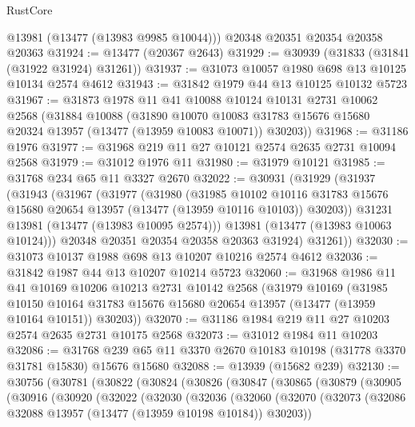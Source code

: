 \begin{lexlean}{RustCore}
\begin{coremodule}
      @13981
      (@13477 (@13983 @9985 @10044)))
    @20348
    @20351
    @20354
    @20358
    @20363
@31924 := @13477 (@20367 @2643)
@31929 := @30939 (@31833 (@31841 (@31922 @31924) @31261))
@31937 := @31073 @10057 @1980 @698 @13 @10125 @10134 @2574 @4612
@31943 := @31842 @1979 @44 @13 @10125 @10132 @5723
@31967 := @31873
    @1978
    @11
    @41
    @10088
    @10124
    @10131
    @2731
    @10062
    @2568
    (@31884
      @10088
      (@31890
        @10070
        @10083
        @31783
        @15676
        @15680
        @20324
        @13957
        (@13477 (@13959 @10083 @10071))
        @30203))
@31968 := @31186 @1976
@31977 := @31968 @219 @11 @27 @10121 @2574 @2635 @2731 @10094 @2568
@31979 := @31012 @1976 @11
@31980 := @31979 @10121
@31985 := @31768 @234 @65 @11 @3327 @2670
@32022 := @30931
    (@31929
      (@31937
        (@31943
          (@31967
            (@31977
              (@31980
                (@31985
                  @10102
                  @10116
                  @31783
                  @15676
                  @15680
                  @20654
                  @13957
                  (@13477 (@13959 @10116 @10103))
                  @30203))
              @31231
              @13981
              (@13477 (@13983 @10095 @2574)))
            @13981
            (@13477 (@13983 @10063 @10124)))
          @20348
          @20351
          @20354
          @20358
          @20363
          @31924)
        @31261))
@32030 := @31073 @10137 @1988 @698 @13 @10207 @10216 @2574 @4612
@32036 := @31842 @1987 @44 @13 @10207 @10214 @5723
@32060 := @31968
    @1986
    @11
    @41
    @10169
    @10206
    @10213
    @2731
    @10142
    @2568
    (@31979
      @10169
      (@31985
        @10150
        @10164
        @31783
        @15676
        @15680
        @20654
        @13957
        (@13477 (@13959 @10164 @10151))
        @30203))
@32070 := @31186 @1984 @219 @11 @27 @10203 @2574 @2635 @2731 @10175 @2568
@32073 := @31012 @1984 @11 @10203
@32086 := @31768 @239 @65 @11 @3370 @2670 @10183 @10198 (@31778 @3370 @31781 @15830) @15676 @15680
@32088 := @13939 (@15682 @239)
@32130 := @30756
    (@30781
      (@30822
        (@30824
          (@30826
            (@30847
              (@30865
                (@30879
                  (@30905
                    (@30916
                      (@30920
                        (@32022
                          (@32030
                            (@32036
                              (@32060
                                (@32070
                                  (@32073
                                    (@32086 @32088 @13957 (@13477 (@13959 @10198 @10184)) @30203))

\end{coremodule}
\end{lexlean}
